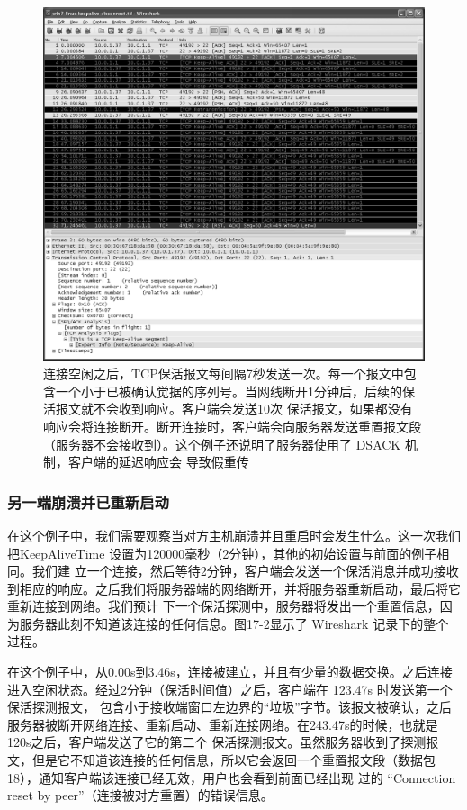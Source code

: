 \begin{figure}[!htb]
    \centering
	\includegraphics[width=1\textwidth]{imgs/17/17-1.png}
	\caption{连接空闲之后，TCP保活报文每间隔7秒发送一次。每一个报文中包含一个小于已被确认觉据的序列号。当网线断开1分钟后，后续的保活报文就不会收到响应。客户端会发送10次
    保活报文，如果都没有响应会将连接断开。断开连接时，客户端会向服务器发送重置报文段（服务器不会接收到）。这个例子还说明了服务器使用了 DSACK 机制，客户端的延迟响应会
    导致假重传}
\end{figure}

\subsubsection{另一端崩溃并已重新启动}
在这个例子中，我们需要观察当对方主机崩溃并且重启时会发生什么。这一次我们把KeepAliveTime 设置为120000毫秒（2分钟），其他的初始设置与前面的例子相同。我们建
立一个连接，然后等待2分钟，客户端会发送一个保活消息并成功接收到相应的响应。之后我们将服务器端的网络断开，并将服务器重新启动，最后将它重新连接到网络。我们预计
下一个保活探测中，服务器将发出一个重置信息，因为服务器此刻不知道该连接的任何信息。图17-2显示了 Wireshark 记录下的整个过程。

在这个例子中，从0.00s到3.46s，连接被建立，并且有少量的数据交换。之后连接进入空闲状态。经过2分钟（保活时间值）之后，客户端在 123.47s 时发送第一个保活探测报文，
包含小于接收端窗口左边界的“垃圾”字节。该报文被确认，之后服务器被断开网络连接、重新启动、重新连接网络。在243.47s的时候，也就是120s之后，客户端发送了它的第二个
保活探测报文。虽然服务器收到了探测报文，但是它不知道该连接的任何信息，所以它会返回一个重置报文段（数据包18），通知客户端该连接已经无效，用户也会看到前面已经出现
过的 “Connection reset by peer”（连接被对方重置）的错误信息。

